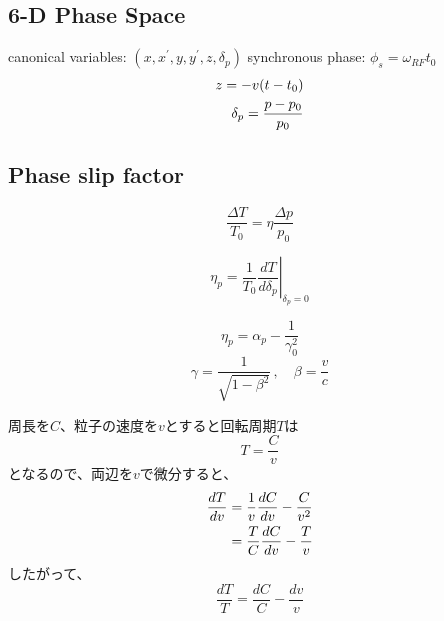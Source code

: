 \documentclass[10pt,a4paper]{ltjsarticle}
\begin{document}
\subsection{6-D Phase Space}
canonical variables: $(x, x^{'}, y, y^{'}, z, \delta_p)$ synchronous phase: $\phi_s =\omega_{RF} t_0$
%
\begin{align}
     z = -v(t-t_0) \notag \\
     \delta_p =\frac{p-p_0}{p_0} \notag
\end{align}
%
\subsection{Phase slip factor}
\begin{equation}
    \frac{\Delta T}{T_0}=\eta\frac{\Delta p}{p_0}
    \label{slip}
\end{equation}

\begin{equation}
    \eta_p = \frac{1}{T_0}\left. \frac{dT}{d\delta_p}\right|_{\delta_p = 0}
\end{equation}

\begin{equation}
    \eta_p=\alpha_p - \frac{1}{\gamma_0^2}
    \label{alppha_slip}
\end{equation}
\begin{equation}
    \gamma = \frac{1}{\sqrt{1-\beta^2}}\, , \quad \beta = \frac{v}{c}
\end{equation}

周長を$C$、粒子の速度を$v$とすると回転周期$T$は
%
\begin{equation}
    T=\frac{C}{v}
\end{equation}
%
となるので、両辺を$v$で微分すると、
%
\begin{align}
    \frac{dT}{dv} &= \frac{1}{v}\frac{dC}{dv}-\frac{C}{v^2} \notag \\
    & = \frac{T}{C}\frac{dC}{dv} - \frac{T}{v}
\end{align}
%
したがって、
%
\begin{equation}
    \frac{dT}{T} = \frac{dC}{C} - \frac{dv}{v}
\end{equation}
%
\end{document}
